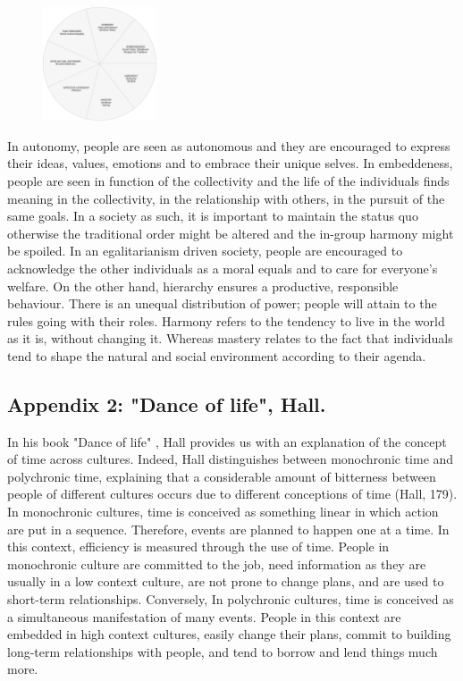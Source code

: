 \documentclass[../main.tex]{subfiles}
\begin{document}
\begin{figure}[h]
    \centering\includegraphics[width=0.3\textwidth]{images/socialvalues.pdf}
\end{figure}

In autonomy, people are seen as autonomous and they are encouraged to express their ideas, values, emotions and to embrace their unique selves. In embeddeness, people are seen in function of the collectivity and the life of the individuals finds meaning in the collectivity, in the relationship with others, in the pursuit of the same goals. In a society as such, it is important to maintain the status quo otherwise the traditional order might be altered and the in-group harmony might be spoiled. In an egalitarianism driven society, people are encouraged to acknowledge the other individuals as a moral equals and to care for everyone's welfare. On the other hand, hierarchy ensures a productive, responsible behaviour. There is an unequal distribution of power; people will attain to the rules going with their roles. Harmony refers to the tendency to live in the world as it is, without changing it. Whereas mastery relates to the fact that individuals tend to shape the natural and social environment according to their agenda.


\subsection*{Appendix 2: "Dance of life", Hall.}

In his book "Dance of life" \cite{hall2}, Hall provides us with an explanation of the concept of time across cultures. Indeed, Hall distinguishes between monochronic time and polychronic time, explaining that a considerable amount of bitterness between people of different cultures occurs due to different conceptions of time (Hall, 179). In monochronic cultures, time is conceived as something linear in which action are put in a sequence. Therefore, events are planned to happen one at a time. In this context, efficiency is measured through the use of time. People in monochronic culture are committed to the job, need information as they are usually in a low context culture, are not prone to change plans, and are used to short-term relationships. Conversely, In polychronic cultures, time is conceived as a simultaneous manifestation of many events. People in this context are embedded in high context cultures, easily change their plans, commit to building long-term relationships with people, and tend to borrow and lend things much more.\\
\end{document}
